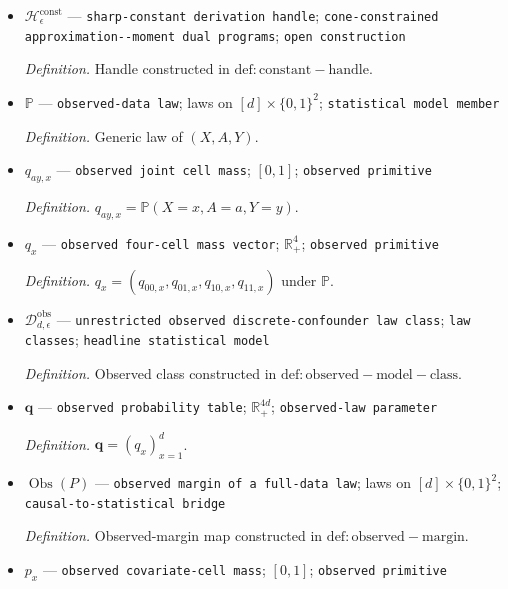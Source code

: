 \documentclass{article}
\begin{document}
\begin{itemize}
  \par\smallskip\noindent\emph{Definition.} Observation law obtained by mixing a \(\operatorname{Pois}(2n)\)-sample from \(P_\theta^{\mathrm{dense}}\) under \(\Pi_{1,n,d}\).
  \item \(\mathscr H_\epsilon^{\mathrm{const}}\) --- \texttt{sharp-\allowbreak{}constant derivation handle}; \texttt{cone-\allowbreak{}constrained approximation-\allowbreak{}-\allowbreak{}moment dual programs}; \texttt{open construction}
  \par\smallskip\noindent\emph{Definition.} Handle constructed in \(\mathrm{def:constant-handle}\).
  \item \(\mathbb P\) --- \texttt{observed-\allowbreak{}data law}; laws on \([d]\times\{0,1\}^2\); \texttt{statistical model member}
  \par\smallskip\noindent\emph{Definition.} Generic law of \((X,A,Y)\).
  \item \(q_{ay,x}\) --- \texttt{observed joint cell mass}; \([0,1]\); \texttt{observed primitive}
  \par\smallskip\noindent\emph{Definition.} \(q_{ay,x}=\mathbb P(X=x,A=a,Y=y)\).
  \item \(q_x\) --- \texttt{observed four-\allowbreak{}cell mass vector}; \(\mathbb R_+^4\); \texttt{observed primitive}
  \par\smallskip\noindent\emph{Definition.} \(q_x=(q_{00,x},q_{01,x},q_{10,x},q_{11,x})\) under \(\mathbb P\).
  \item \(\mathcal D_{d,\epsilon}^{\mathrm{obs}}\) --- \texttt{unrestricted observed discrete-\allowbreak{}confounder law class}; \texttt{law classes}; \texttt{headline statistical model}
  \par\smallskip\noindent\emph{Definition.} Observed class constructed in \(\mathrm{def:observed-model-class}\).
  \item \(\mathbf q\) --- \texttt{observed probability table}; \(\mathbb R_+^{4d}\); \texttt{observed-\allowbreak{}law parameter}
  \par\smallskip\noindent\emph{Definition.} \(\mathbf q=(q_x)_{x=1}^d\).
  \item \(\operatorname{Obs}(P)\) --- \texttt{observed margin of a full-\allowbreak{}data law}; laws on \([d]\times\{0,1\}^2\); \texttt{causal-\allowbreak{}to-\allowbreak{}statistical bridge}
  \par\smallskip\noindent\emph{Definition.} Observed-margin map constructed in \(\mathrm{def:observed-margin}\).
  \item \(p_x\) --- \texttt{observed covariate-\allowbreak{}cell mass}; \([0,1]\); \texttt{observed primitive}

\end{itemize}
\end{document}
